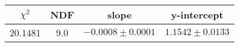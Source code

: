 \begin{tabular}{|c|c|c|c|}

\hline
$\chi^{2}$ & NDF & slope & y-intercept  \\
\hline
20.1481 & 9.0 & $-0.0008\pm0.0001$ & $1.1542\pm0.0133$ \\
\hline

\end{tabular}